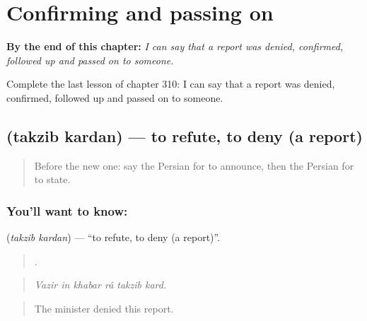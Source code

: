 
\chapter{Confirming and passing on}
\label{ch:fa-confirming-and-passing-on}

\begin{chapteropening}
\textbf{By the end of this chapter:} \emph{I can say that a report was denied, confirmed, followed up and passed on to someone.}

Complete the last lesson of chapter 310: I can say that a report was denied, confirmed, followed up and passed on to someone.
\end{chapteropening}

\section[\texorpdfstring{\fa{تکذیب} \fa{کردن} (takzib kardan)}{تکذیب کردن (takzib kardan)}]{  (takzib kardan) — to refute, to deny (a report)}

\label{lesson:FA-C310-takzib-kardan}



\begin{quote}
Before the new one: say the Persian for to announce, then the Persian for to state.
\end{quote}

\subsection*{You'll want to know:  }
\textbf{ } (\emph{takzib kardan}) — \textquotedblleft{}to refute, to deny (a report)\textquotedblright{}.

\begin{quote}
     .
\end{quote}

\begin{quote}
\emph{Vazir in khabar râ takzib kard.}
\end{quote}

\begin{quote}
The minister denied this report.
\end{quote}

